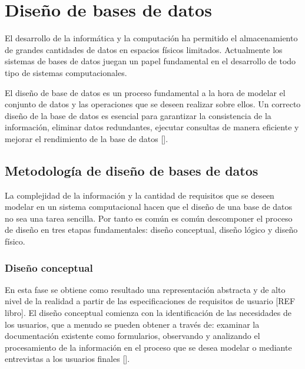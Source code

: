 




\section{Diseño de bases de datos}
El desarrollo de la informática y la computación ha permitido
el almacenamiento de grandes cantidades de datos en espacios 
físicos limitados. Actualmente los sistemas de bases de datos juegan
un papel fundamental en el desarrollo de todo tipo de sistemas computacionales.

El diseño de base de datos es un proceso fundamental a la hora 
de modelar el conjunto de datos y las operaciones que se deseen
realizar sobre ellos. Un correcto diseño de la base de datos
es esencial para garantizar la consistencia de la información,
eliminar datos redundantes, ejecutar consultas de manera 
eficiente y mejorar el rendimiento de la base de datos [\cite{db_book_cap2}]. 

\subsection{Metodología de diseño de bases de datos}
La complejidad de la información y la cantidad de requisitos que se 
deseen modelar en un sistema computacional hacen que el diseño de una 
base de datos no sea una tarea sencilla. Por tanto es común es común 
descomponer el proceso de diseño en tres etapas fundamentales: diseño conceptual,
diseño lógico y diseño físico. 


\subsubsection{Diseño conceptual}
En esta fase se obtiene como resultado una representación 
abstracta y de alto nivel de la realidad a partir de las 
especificaciones de requisitos de usuario [REF libro]. El diseño
conceptual comienza con la identificación de las necesidades de los 
usuarios, que a menudo se pueden obtener a través de: examinar
la documentación existente como formularios, observando y
analizando el procesamiento de la información en el proceso que 
se desea modelar o mediante entrevistas a los usuarios finales [\cite{db_requirement_analysis}].

